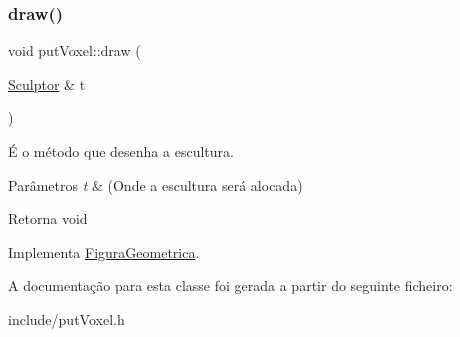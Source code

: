 \subsubsection{\texorpdfstring{draw()}{draw()}}
{\footnotesize\ttfamily void put\+Voxel\+::draw (\begin{DoxyParamCaption}\item[{\hyperlink{class_sculptor}{Sculptor} \&}]{t }\end{DoxyParamCaption})\hspace{0.3cm}{\ttfamily [virtual]}}



É o método que desenha a escultura. 


\begin{DoxyParams}{Parâmetros}
{\em t} & (Onde a escultura será alocada) \\
\hline
\end{DoxyParams}
\begin{DoxyReturn}{Retorna}
void 
\end{DoxyReturn}


Implementa \hyperlink{class_figura_geometrica_a34585fd7c0bd7378fc69c4ee208e676c}{Figura\+Geometrica}.



A documentação para esta classe foi gerada a partir do seguinte ficheiro\+:\begin{DoxyCompactItemize}
\item 
include/put\+Voxel.\+h\end{DoxyCompactItemize}
